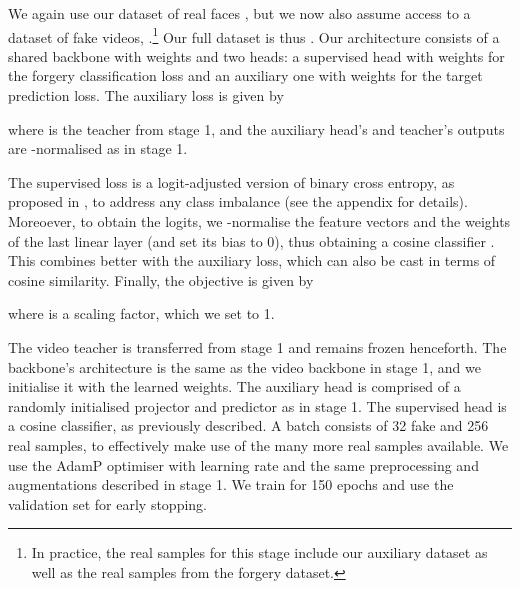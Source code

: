 \documentclass[10pt,twocolumn,letterpaper]{article}
\begin{document}
\begin{description}[wide,itemindent=\labelsep]
\item[Formulation.] We again use our dataset of real faces , but we now also assume access to a dataset of fake videos, .\footnote{In practice, the real samples for this stage include our auxiliary dataset as well as the real samples from the forgery dataset.} Our full dataset is thus . Our architecture consists of a shared backbone  with weights  and two heads: a supervised head with weights  for the forgery classification loss and an auxiliary one  with weights  for the target prediction loss. The auxiliary loss is given by

where  is the teacher from stage 1, and the auxiliary head's and teacher's outputs are -normalised as in stage 1.

The supervised loss  is a logit-adjusted version of binary cross entropy, as proposed in \cite{menon2020long}, to address any class imbalance (see the appendix for details). Moreoever, to obtain the logits, we -normalise the feature vectors and the weights of the last linear layer (and set its bias to 0), thus obtaining a cosine classifier \cite{wang2017normface}. This combines better with the auxiliary loss, which can also be cast in terms of cosine similarity. Finally, the objective is given by

where  is a scaling factor, which we set to 1.

\item[Implementation details.] The video teacher is transferred from stage 1 and remains frozen henceforth. The backbone's architecture is the same as the video backbone in stage 1, and we initialise it with the learned weights. The auxiliary head is comprised of a randomly initialised projector and predictor as in stage 1. The supervised head is a cosine classifier, as previously described. A batch consists of 32 fake and 256 real samples, to effectively make use of the many more real samples available. We use the AdamP optimiser with learning rate  and the same preprocessing and augmentations described in stage 1. We train for 150 epochs and use the validation set for early stopping.

\end{description}
\end{document}
